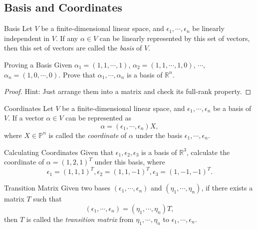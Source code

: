 \subsection{Basis and Coordinates}

\begin{definition}{Basis}{}
  Let $V$ be a finite-dimensional linear space,
  and $\epsilon_1, \cdots, \epsilon_n$ be linearly independent in $V$.
  If any $\alpha \in V$ can be linearly represented by this set of vectors,
  then this set of vectors are called the \emph{basis} of $V$.
\end{definition}

\begin{example}{Proving a Basis}{}
  Given $\alpha_1 = (1, 1, \cdots, 1)$,
  $\alpha_2 = (1, 1, \cdots, 1, 0)$,
  $\cdots$,
  $\alpha_n = (1, 0, \cdots, 0)$.
  Prove that $\alpha_1, \cdots, \alpha_n$ is a basis of $\mathbb{R}^n$.
\end{example}

\begin{proof}
  Hint: Just arrange them into a matrix and check its full-rank property.
\end{proof}

\begin{definition}{Coordinates}{}
  Let $V$ be a finite-dimensional linear space,
  and $\epsilon_1, \cdots, \epsilon_n$ be a basis of $V$.
  If a vector $\alpha \in V$ can be represented as
  \begin{equation}
    \alpha = (\epsilon_1, \cdots, \epsilon_n)X,
  \end{equation}
  where $X \in \mathbb{P}^n$ is called the \emph{coordinate} of $\alpha$
  under the basis $\epsilon_1,\cdots, \epsilon_n$.
\end{definition}

\begin{example}{Calculating Coordinates}{}
  Given that $\epsilon_{1}, \epsilon_2, \epsilon_3$ is a basis of
  $\mathbb{R}^3$,
  calculate the coordinate of $\alpha = (1, 2, 1)^T$ under this basis, where
  \begin{equation}
    \epsilon_1=(1,1,1)^T,\epsilon_2=(1,1,-1)^T,\epsilon_3=(1,-1,-1)^T.
    \end{equation}
\end{example}

\begin{definition}{Transition Matrix}{}
  Given two bases $(\epsilon_1, \cdots, \epsilon_n)$
  and $(\eta_1, \cdots, \eta_n)$, if there exists a matrix $T$ such that
  \begin{equation}
    (\epsilon_1, \cdots, \epsilon_n) = (\eta_1, \cdots, \eta_n)T,
  \end{equation}
  then $T$ is called the \emph{transition matrix} from $\eta_1, \cdots, \eta_n$
  to $\epsilon_1, \cdots, \epsilon_n$.
\end{definition}

